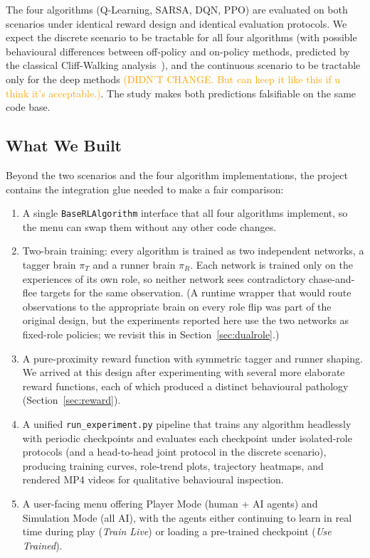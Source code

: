 \documentclass[conference]{IEEEtran}
\newcommand{\re}[1]{\textcolor{orange}{#1}}
\begin{document}
The four algorithms (Q-Learning, SARSA, DQN, PPO) are evaluated on both
scenarios under identical reward design and identical evaluation
protocols. We expect the discrete scenario to be tractable for all four
algorithms (with possible behavioural differences between off-policy and
on-policy methods, predicted by the classical Cliff-Walking analysis~\cite{sutton2018}), and
the continuous scenario to be tractable only for the deep methods \re{(DIDN'T CHANGE. But can keep it like this if u think it's acceptable.)}. The
study makes both predictions falsifiable on the same code base.

\subsection{What We Built}

Beyond the two scenarios and the four algorithm implementations, the
project contains the integration glue needed to make a fair comparison:
\begin{enumerate}
    \item A single \texttt{BaseRLAlgorithm} interface that all four
    algorithms implement, so the menu can swap them without any other code
    changes.
    \item Two-brain training: every algorithm is trained as two
    independent networks, a tagger brain $\pi_T$ and a runner brain
    $\pi_R$. Each network is trained only on the experiences of its
    own role, so neither network sees contradictory chase-and-flee
    targets for the same observation. (A runtime wrapper that would
    route observations to the appropriate brain on every role flip was
    part of the original design, but the experiments reported here use
    the two networks as fixed-role policies; we revisit this in
    Section~\ref{sec:dualrole}.)
    \item A pure-proximity reward function with symmetric tagger and
    runner shaping. We arrived at this design after experimenting with
    several more elaborate reward functions, each of which produced a
    distinct behavioural pathology (Section~\ref{sec:reward}).
    \item A unified \texttt{run\_experiment.py} pipeline that trains any
    algorithm headlessly with periodic checkpoints and evaluates each
    checkpoint under isolated-role protocols (and a head-to-head joint
    protocol in the discrete scenario), producing training curves,
    role-trend plots, trajectory heatmaps, and rendered MP4 videos for
    qualitative behavioural inspection.
    \item A user-facing menu offering Player Mode (human + AI agents) and
    Simulation Mode (all AI), with the agents either continuing to learn
    in real time during play (\emph{Train Live}) or loading a pre-trained
    checkpoint (\emph{Use Trained}).
\end{enumerate}
\end{document}
